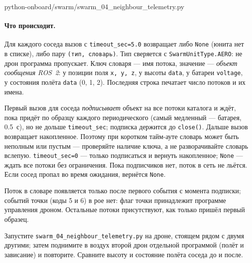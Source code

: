 \begin{codefile}[python]{python-onboard/swarm/swarm_04_neighbour_telemetry.py}
\end{codefile}

\paragraph{Что происходит.} Для каждого соседа вызов  с \verb|timeout_sec=5.0| возвращает либо \verb|None| (юнита нет в списке), либо пару \verb|(тип, словарь)|. Тип сверяется с \verb|SwarmUnitType.AERO|: не дрон программа пропускает. Ключ словаря --- имя потока, значение --- \emph{объект сообщения ROS~2}: у позиции поля \verb|x, y, z|, у высоты \verb|data|, у батареи \verb|voltage|, у состояния полёта \verb|data| (0, 1, 2). Последняя строка печатает число потоков и их имена.

\begin{rulebox}
Первый вызов для соседа \emph{подписывает} объект на все потоки каталога и ждёт, пока придёт по образцу каждого периодического (самый медленный --- батарея, 0.5~с), но не дольше \verb|timeout_sec|; подписка держится до \verb|close()|. Дальше вызов возвращает накопленное. Поэтому при коротком тайм-ауте словарь может быть неполным или пустым --- проверяйте наличие ключа, а не разворачивайте словарь вслепую. \verb|timeout_sec=0| --- только подписаться и вернуть накопленное; \verb|None| --- ждать все потоки без ограничения. Пока подписчиков нет, поток в сеть не льётся. Если сосед пропал во время ожидания, вернётся \verb|None|.
\end{rulebox}

Поток  в словаре появляется только после первого события с момента подписки; событий точки (коды 5 и 6) в рое нет: флаг точки принадлежит программе управления дроном. Остальные потоки присутствуют, как только пришёл первый образец.

\begin{taskbox}
Запустите \texttt{swarm\_04\_neighbour\_telemetry.py} на дроне, стоящем рядом с двумя другими; затем поднимите в воздух второй дрон отдельной программой (полёт и зависание) и повторите. Сравните высоту и состояние полёта соседа до и после.
\end{taskbox}

